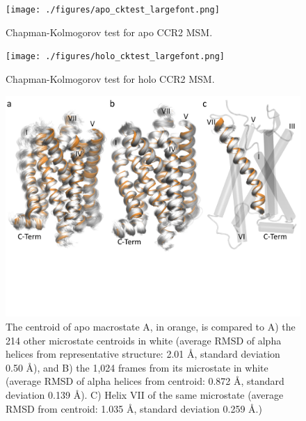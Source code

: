 \begin{figure}[htbp]
\centering
\texttt{[image: ./figures/apo\_cktest\_largefont.png]}
\caption{Chapman-Kolmogorov test for apo CCR2 MSM.}
\label{fig:apo_its_ck}
\end{figure}

\begin{figure}[htbp]
  \centering
  \texttt{[image: ./figures/holo\_cktest\_largefont.png]}
 \caption{Chapman-Kolmogorov test for holo CCR2 MSM.}
  \label{fig:holo_its_ck}
\end{figure}

\begin{figure}[htbp]
\centering
\includegraphics[width=\textwidth]{./figures/centroid-micromacrostates.png}
\caption[Quantifying the representativeness of microstate and macrostate centroid definitions]{The centroid of apo macrostate A, in orange, is compared to A) the 214 other microstate centroids in white (average RMSD of alpha helices from representative structure: 2.01 {\AA}, standard deviation 0.50 {\AA}), and B) the 1,024 frames from its microstate in white (average RMSD of alpha helices from centroid: 0.872 {\AA}, standard deviation 0.139 {\AA}). C) Helix VII of the same microstate (average RMSD from centroid: 1.035 {\AA}, standard deviation 0.259 {\AA}.)}
\label{fig:centroid-helixVII}
\end{figure}

